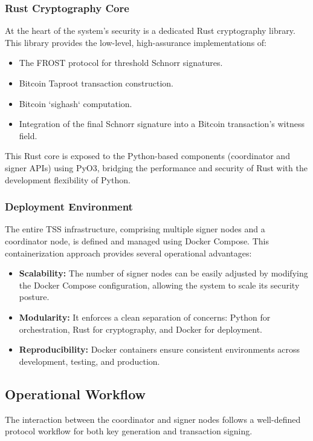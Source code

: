 \documentclass{DESSThesis}
\begin{document}
\subsubsection{Rust Cryptography Core}
At the heart of the system's security is a dedicated Rust cryptography library. This library provides the low-level, high-assurance implementations of:
\begin{itemize}
    \item The FROST protocol for threshold Schnorr signatures.
    \item Bitcoin Taproot transaction construction.
    \item Bitcoin `sighash` computation.
    \item Integration of the final Schnorr signature into a Bitcoin transaction's witness field.
\end{itemize}
This Rust core is exposed to the Python-based components (coordinator and signer APIs) using PyO3, bridging the performance and security of Rust with the development flexibility of Python.

\subsubsection{Deployment Environment}
The entire TSS infrastructure, comprising multiple signer nodes and a coordinator node, is defined and managed using Docker Compose. This containerization approach provides several operational advantages:
\begin{itemize}
    \item \textbf{Scalability:} The number of signer nodes can be easily adjusted by modifying the Docker Compose configuration, allowing the system to scale its security posture.
    \item \textbf{Modularity:} It enforces a clean separation of concerns: Python for orchestration, Rust for cryptography, and Docker for deployment.
    \item \textbf{Reproducibility:} Docker containers ensure consistent environments across development, testing, and production.
\end{itemize}

\subsection{Operational Workflow}
The interaction between the coordinator and signer nodes follows a well-defined protocol workflow for both key generation and transaction signing.
\end{document}
